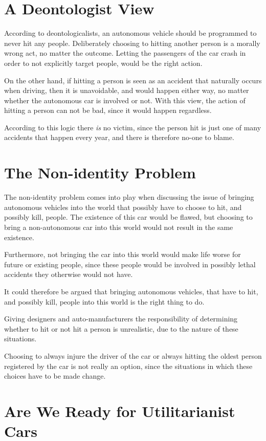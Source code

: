 \section{A Deontologist View}
\newpar According to deontologicalists, an autonomous vehicle should be programmed to never hit any people. Deliberately choosing to hitting another person is a morally wrong act, no matter the outcome. Letting the passengers of the car crash in order to not explicitly target people, would be the right action. 

On the other hand, if hitting a person is seen as an accident that naturally occurs when driving, then it is unavoidable, and would happen either way, no matter whether the autonomous car is involved or not. With this view, the action of hitting a person can not be bad, since it would happen regardless. 

According to this logic there \textit{is} no victim, since the person hit is just one of many accidents that happen every year, and there is therefore no-one to blame.

\section{The Non-identity Problem}
\newpar The non-identity problem comes into play when discussing the issue of bringing autonomous vehicles into the world that possibly have to choose to hit, and possibly kill, people. The existence of this car would be flawed, but choosing to bring a non-autonomous car into this world would not result in the same existence. 

Furthermore, not bringing the car into this world would make life worse for future or existing people, since these people would be involved in possibly lethal accidents they otherwise would not have.

\newpar It could therefore be argued that bringing autonomous vehicles, that have to hit, and possibly kill, people into this world is the right thing to do. 

\newpar Giving designers and auto-manufacturers the responsibility of determining whether to hit or not hit a person is unrealistic, due to the nature of these situations. 

Choosing to always injure the driver of the car or always hitting the oldest person registered by the car is not really an option, since the situations in which these choices have to be made change. 


\section{Are We Ready for Utilitarianist Cars}